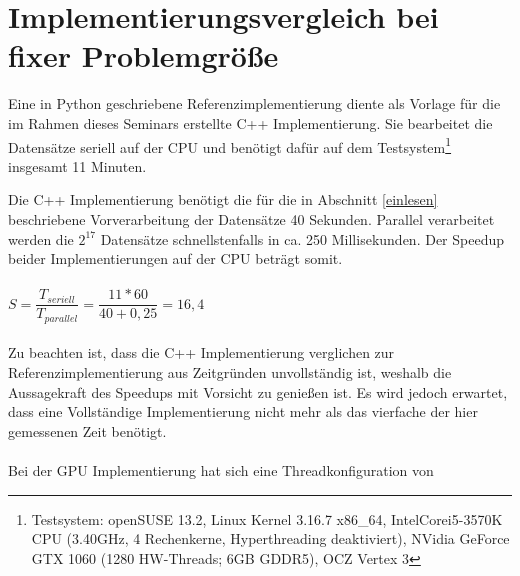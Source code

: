 \section{Implementierungsvergleich bei fixer Problemgröße}
Eine in Python geschriebene Referenzimplementierung diente als Vorlage für die im Rahmen dieses Seminars erstellte C++ Implementierung. Sie bearbeitet die Datensätze seriell auf der CPU und benötigt dafür auf dem Testsystem\footnote{Testsystem: openSUSE 13.2, Linux Kernel 3.16.7 x86\_64, Intel\textregistered Core\texttrademark i5-3570K CPU (3.40GHz, 4 Rechenkerne, Hyperthreading deaktiviert), NVidia GeForce GTX 1060 (1280 HW-Threads; 6GB GDDR5), OCZ Vertex 3} insgesamt 11 Minuten.

Die C++ Implementierung benötigt die für die in Abschnitt \ref{einlesen} beschriebene Vorverarbeitung der Datensätze 40 Sekunden. Parallel verarbeitet werden die $2^{17}$ Datensätze schnellstenfalls in ca. 250 Millisekunden.
Der Speedup beider Implementierungen auf der CPU beträgt somit.
\\\\
$S = \dfrac{T_{seriell}}{T_{parallel}} = \dfrac{11*60}{40+0,25} = 16,4$
\\\\
Zu beachten ist, dass die C++ Implementierung verglichen zur Referenzimplementierung aus Zeitgründen unvollständig ist, weshalb die Aussagekraft des Speedups mit Vorsicht zu genießen ist. Es wird jedoch erwartet, dass eine Vollständige Implementierung nicht mehr als das vierfache der hier gemessenen Zeit benötigt.
\\\\
Bei der GPU Implementierung hat sich eine Threadkonfiguration von

